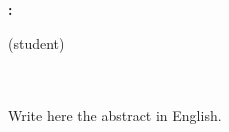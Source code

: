 \thispagestyle{empty}


\begin{center}
{\large\bfseries \miTitle: \miSubtitle}\\
\end{center}
\begin{center}
\miNombre (student)\\
\end{center}

\\

\vspace{0.7cm}
\\

Write here the abstract in English.

\thispagestyle{empty}
\cleardoublepage
\endinput
